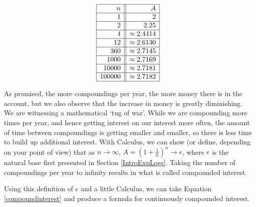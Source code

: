 \[ \begin{array}{|r||r|}  

\hline

 n & A   \\ \hline
1  & 2  \\  \hline
2  & 2.25  \\  \hline
4 & \approx 2.4414  \\  \hline
12 & \approx 2.6130  \\  \hline
360  & \approx  2.7145 \\  \hline
1000  & \approx 2.7169 \\  \hline
10000  & \approx 2.7181  \\  \hline
100000 & \approx 2.7182  \\  \hline
\end{array} \]

As promised, the more compoundings per year, the more money there is in the account, but we also observe that the increase in money is greatly diminishing.  We are witnessing a mathematical `tug of war'.  While we are compounding more times per year, and hence getting interest on our interest more often, the amount of time between compoundings is getting smaller and smaller, so there is less time to build up additional interest. With Calculus, we can show (or define, depending on your point of view) that as $n \rightarrow \infty$, $A = \left(1+\frac{1}{n}\right)^{n} \rightarrow e$, where $e$ is the natural base first presented in Section \ref{IntroExpLogs}.  Taking the number of compoundings per year to infinity results in what is called   compounded interest.  

\smallskip


\smallskip

Using this definition of $e$ and a little Calculus, we can take Equation \ref{compoundinterest} and produce a formula for continuously compounded interest.

\smallskip


